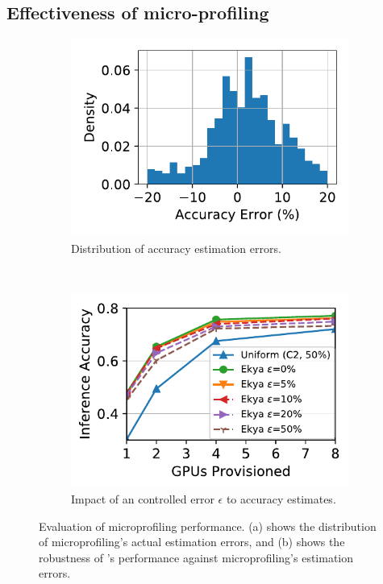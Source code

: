 \subsection{Effectiveness of micro-profiling}
\label{subsec:eval-profiling}


\begin{figure}[t]
\captionsetup[subfigure]{justification=centering}
  \centering
  \begin{subfigure}[t]{0.48\linewidth}
    \centering
    \includegraphics[width=\linewidth]{ekya/results/microprofiling/microprofiling_accerror.pdf}
    \caption{Distribution of accuracy estimation errors.}
    \label{fig:microprofiling-benchmark}
  \end{subfigure}
  ~
  \begin{subfigure}[t]{0.48\linewidth}
    \centering
    \includegraphics[width=\linewidth]{ekya/results/sensitivity/sensitivity_profileerrors_cityscapes.pdf} 
    \caption{Impact of an controlled error $\epsilon$ to accuracy estimates.}
    \label{fig:sensitivity-accuracy-error}
  \end{subfigure}
  \caption{
      Evaluation of microprofiling performance. (a) shows the distribution of microprofiling's actual estimation errors, and (b) shows the robustness of \name's performance against microprofiling's estimation errors.
  }
\end{figure}


